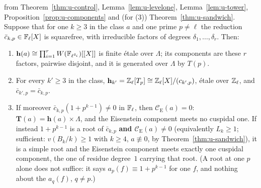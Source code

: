 \documentclass[11pt]{article}
\newcommand{\Iw}{\Lambda}                         %
\newcommand{\hcusp}{\mathbf{h}}                   %
\newcommand{\Tu}{\mathbf{T}}                      %
\newcommand{\Eis}{\mathrm{E}}
\newcommand{\Cg}{\mathcal{C}}                     %
\newcommand{\Zl}{\Z_\ell}
\begin{document}
\begin{theorem}\label{thm:u-etale}
\PROVED{} from Theorem~\ref{thm:u-control}, Lemma~\ref{lem:u-levelone}, Lemma~\ref{lem:u-tower}, Proposition~\ref{prop:u-components} and (for (3))
Theorem~\ref{thm:u-sandwich}. Suppose that for one $k\ge3$ in the
class $a$ and one prime $p\ne\ell$ the reduction $\bar c_{k,p}\in\mathbb{F}_\ell[X]$ is squarefree, with irreducible factors of degrees
$\delta_1,\dots,\delta_r$. Then:
\begin{enumerate}
\item $\hcusp(a)\cong\prod_{i=1}^{r}W(\F_{\ell^{\delta_i}})[[X]]$ is finite étale over $\Iw$; its components are these $r$ factors, pairwise
  disjoint, and it is generated over $\Iw$ by $T(p)$.
\item For every $k'\ge3$ in the class, $\hcusp_{k'}=\Zl[T_p]\cong\Zl[X]/(c_{k',p})$, étale over $\Zl$, and $\bar c_{k',p}=\bar c_{k,p}$.
\item If moreover $\bar c_{k,p}(1+p^{k-1})\ne0$ in $\mathbb{F}_\ell$, then $\Cg_\Eis(a)=0$: $\Tu(a)=\hcusp(a)\times\Iw$, and the Eisenstein component meets no
  cuspidal one. If instead $1+p^{k-1}$ is a root of $\bar c_{k,p}$ \textbf{and $\Cg_\Eis(a)\ne0$} (equivalently $L_k\ge1$; sufficient:
  $v(B_k/k)\ge1$ with $k\ge4$, $a\not\equiv0$, by Theorem~\ref{thm:u-sandwich}), it is a simple root and the Eisenstein component meets exactly one
  cuspidal component, the one of residue degree~$1$ carrying that root. (A root at one $p$ alone does not suffice: it says $a_p(f)\equiv1+p^{k-1}$ for
  one $f$, and nothing about the $a_q(f)$, $q\ne p$.)
\end{enumerate}
\end{theorem}
\end{document}
